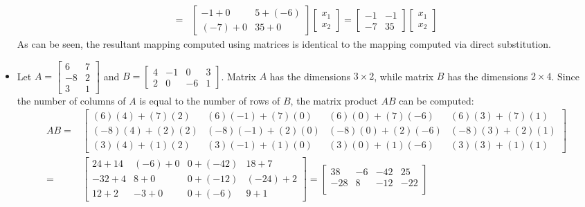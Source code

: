 \documentclass{article}
\begin{document}
\begin{itemize}
\begin{align*}
= & \begin{bmatrix} -1 + 0 & 5 + (-6) \\ (-7) + 0 & 35 + 0 \end{bmatrix}\begin{bmatrix} x_1 \\ x_2 \end{bmatrix} 
= \begin{bmatrix} -1 & -1 \\ -7 & 35 \end{bmatrix}\begin{bmatrix} x_1 \\ x_2 \end{bmatrix} 
\end{align*}
As can be seen, the resultant mapping computed using matrices is identical to the mapping computed via direct substitution. 
\item Let \(A = \begin{bmatrix} 6 & 7 \\ -8 & 2 \\ 3 & 1 \end{bmatrix}\) and \(B = \begin{bmatrix} 4 & -1 & 0 & 3 \\ 2 & 0 & -6 & 1 \end{bmatrix}\). Matrix \(A\) has the dimensions \(3 \times 2\), while matrix \(B\) has the dimensions \(2 \times 4\). Since the number of columns of \(A\) is equal to the number of rows of \(B\), the matrix product \(AB\) can be computed:
\begin{align*}
AB 
= & \begin{bmatrix} 
(6)(4) + (7)(2) & (6)(-1) + (7)(0) & (6)(0) + (7)(-6) & (6)(3) + (7)(1) \\
(-8)(4) + (2)(2) & (-8)(-1) + (2)(0) & (-8)(0) + (2)(-6) & (-8)(3) + (2)(1) \\
(3)(4) + (1)(2) & (3)(-1) + (1)(0) & (3)(0) + (1)(-6) & (3)(3) + (1)(1)  
\end{bmatrix} \\
= & \begin{bmatrix} 
24 + 14 & (-6) + 0 & 0 + (-42) & 18 + 7 \\
-32 + 4 & 8 + 0 & 0 + (-12) & (-24) + 2 \\
12 + 2 & -3 + 0 & 0 + (-6) & 9 + 1  
\end{bmatrix}
= \begin{bmatrix} 
38 & -6 & -42 & 25 \\
-28 & 8 & -12 & -22 \\

\end{bmatrix}
\end{align*}
\end{itemize}
\end{document}
